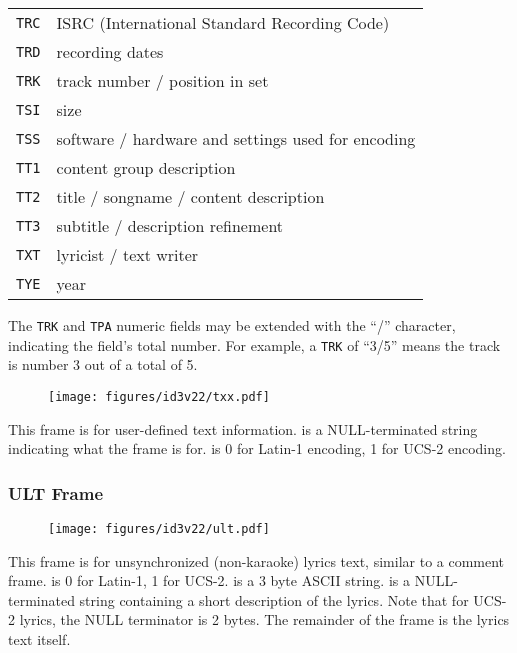 \begin{table}[h]
{\begin{tabular}{|r|l|}
\texttt{TRC} & ISRC (International Standard Recording Code) \\
\texttt{TRD} & recording dates \\
\texttt{TRK} & track number / position in set \\
\texttt{TSI} & size \\
\texttt{TSS} & software / hardware and settings used for encoding \\
\texttt{TT1} & content group description \\
\texttt{TT2} & title / songname / content description \\
\texttt{TT3} & subtitle / description refinement \\
\texttt{TXT} & lyricist / text writer \\
\texttt{TYE} & year \\
\hline
\end{tabular}
}
\end{table}
\par
The \texttt{TRK} and \texttt{TPA} numeric fields may be extended
with the ``/'' character, indicating the field's total number.
For example, a \texttt{TRK} of ``3/5'' means the track is number
3 out of a total of 5.

\clearpage

\begin{figure}[h]
\texttt{[image: figures/id3v22/txx.pdf]}
\end{figure}
This frame is for user-defined text information.
 is a NULL-terminated string indicating
what the frame is for.
 is 0 for Latin-1 encoding, 1 for UCS-2 encoding.

\subsubsection{ULT Frame}
\begin{figure}[h]
\texttt{[image: figures/id3v22/ult.pdf]}
\end{figure}
This frame is for unsynchronized (non-karaoke) lyrics text,
similar to a comment frame.
 is 0 for Latin-1, 1 for UCS-2.
 is a 3 byte ASCII string.
 is a NULL-terminated string
containing a short description of the lyrics.
Note that for UCS-2 lyrics, the NULL terminator is 2 bytes.
The remainder of the frame is the lyrics text itself.

\clearpage

